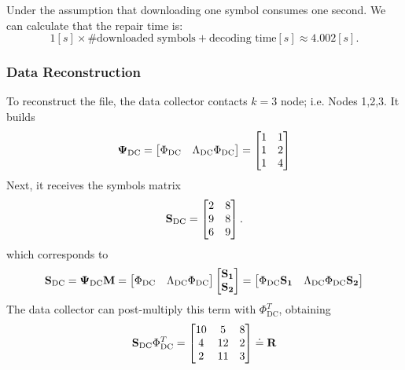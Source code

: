 \documentclass{article}
\begin{document}
Under the assumption that downloading one symbol consumes one second. We can calculate that the repair time is:
\begin{equation*}
1[s] \times \text{\#downloaded symbols} + \text{decoding time}[s] \approx 4.002 [s].
\end{equation*}

\subsubsection*{Data Reconstruction}
To reconstruct the file, the data collector contacts $k=3$ node; i.e. Nodes 1,2,3. It builds 
\begin{equation*}
\vb{\Psi}_{\text{DC}} =
\begin{bmatrix}
\Phi_{\text{DC}} & \Lambda_{\text{DC}}\Phi_{\text{DC}} \\
\end{bmatrix} =  
\begin{bmatrix}
1 & 1 \\
1 & 2 \\
1 & 4
\end{bmatrix}
\end{equation*}
Next, it receives the symbols matrix
\begin{equation*}
\vb{S}_{\text{DC}} =
\begin{bmatrix}
2 & 8 \\
9 & 8 \\
6 & 9 
\end{bmatrix}.
\end{equation*}
which corresponds to 
\begin{equation*}
\vb{S}_{\text{DC}} = \vb{\Psi}_{\text{DC}}\vb{M} =
\begin{bmatrix}
\Phi_{\text{DC}} & \Lambda_{\text{DC}}\Phi_{\text{DC}} \\
\end{bmatrix}
\begin{bmatrix}
\vb{S_1} \\
\vb{S_2}
\end{bmatrix} =
\begin{bmatrix}
\Phi_{\text{DC}}\vb{S_1} & \Lambda_{\text{DC}}\Phi_{\text{DC}}\vb{S_2} \\
\end{bmatrix}
\end{equation*}
The data collector can post-multiply this term with $\Phi_{\text{DC}}^T$, obtaining
\begin{equation*}
\vb{S}_{\text{DC}} \Phi_{\text{DC}}^T =
\begin{bmatrix}
10 & 5 & 8 \\
4 & 12 & 2 \\
2 & 11 & 3 
\end{bmatrix}
\doteq 
\vb{R}
\end{equation*}
\end{document}
